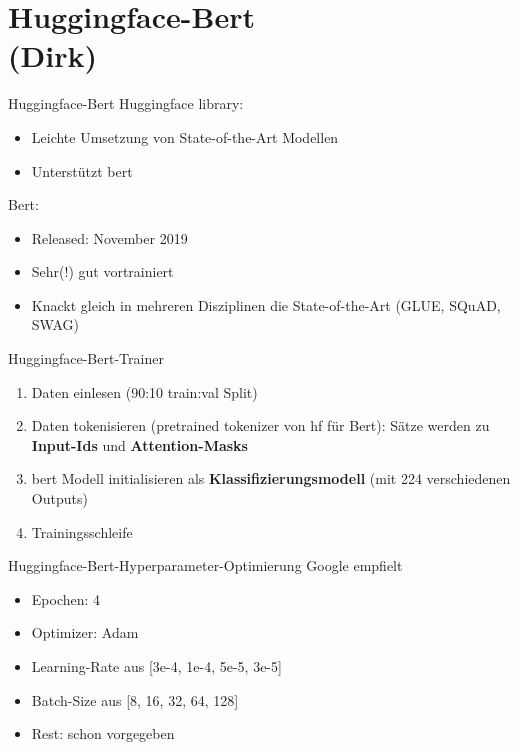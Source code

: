 \documentclass[xcolor=table]{beamer}
\begin{document}
\section{Huggingface-Bert\\(Dirk)}
\begin{frame}[t]{Huggingface-Bert}\vspace{10pt}
	Huggingface library:
	\begin{itemize}
		\item Leichte Umsetzung von State-of-the-Art Modellen
		\item Unterstützt bert
	\end{itemize}
	Bert:
	\begin{itemize}
		\item Released: November 2019
		\item Sehr(!) gut vortrainiert
		\item Knackt gleich in mehreren Disziplinen die State-of-the-Art (GLUE, SQuAD, SWAG)
	\end{itemize}
\end{frame}

\begin{frame}[t]{Huggingface-Bert-Trainer}\vspace{10pt}
	\begin{enumerate}
		\item Daten einlesen (90:10 train:val Split)
		\item Daten tokenisieren (pretrained tokenizer von hf für Bert):
			Sätze werden zu \textbf{Input-Ids} und \textbf{Attention-Masks}
		\item bert Modell initialisieren als \textbf{Klassifizierungsmodell} (mit 224 verschiedenen Outputs)
		\item Trainingsschleife
	\end{enumerate}
\end{frame}

\begin{frame}[t]{Huggingface-Bert-Hyperparameter-Optimierung}\vspace{10pt}
	Google empfielt
	\begin{itemize}
		\item Epochen: 4
		\item Optimizer: Adam
		\item Learning-Rate aus [3e-4, 1e-4, 5e-5, 3e-5]
		\item Batch-Size aus [8, 16, 32, 64, 128]
		\item Rest: schon vorgegeben
	\end{itemize}
\end{frame}
\end{document}
